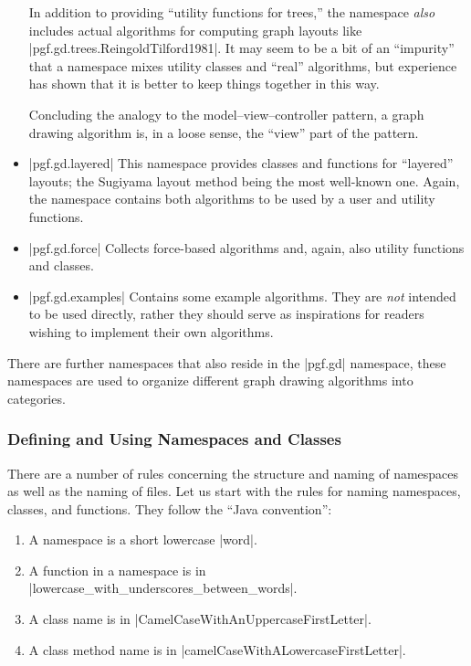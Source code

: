 \begin{itemize}
  In addition to providing ``utility functions for trees,'' the
  namespace \emph{also} includes actual algorithms for computing graph
  layouts like |pgf.gd.trees.ReingoldTilford1981|. It may seem to be a
  bit of an ``impurity'' that a namespace mixes utility classes and
  ``real'' algorithms, but experience has shown that it is better to
  keep things together in this way.

  Concluding the analogy to the model--view--controller pattern, a
  graph drawing algorithm is, in a loose sense, the ``view'' part of
  the pattern.
\item |pgf.gd.layered| This namespace provides classes and functions
  for ``layered'' layouts; the Sugiyama layout method being the most
  well-known one. Again, the namespace contains both algorithms to be
  used by a user and utility functions.
\item |pgf.gd.force| Collects force-based algorithms and, again, also
  utility functions and classes.
\item |pgf.gd.examples| Contains some example algorithms. They are
  \emph{not} intended to be used directly, rather they should serve as
  inspirations for readers wishing to implement their own algorithms.
\end{itemize}

There are further namespaces that also reside in the |pgf.gd|
namespace, these namespaces are used to organize different graph
drawing algorithms into categories.


\subsubsection{Defining and Using Namespaces and Classes}

There are a number of rules concerning the structure and naming of
namespaces as well as the naming of files. Let us start with the
rules for naming namespaces, classes, and functions. They follow the
``Java convention'':

\begin{enumerate}
\item A namespace is a short lowercase |word|.
\item A function in a namespace is in |lowercase_with_underscores_between_words|.
\item A class name is in |CamelCaseWithAnUppercaseFirstLetter|.
\item A class method name is in |camelCaseWithALowercaseFirstLetter|.
\end{enumerate}

